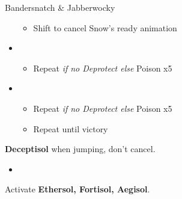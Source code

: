 \begin{battle}[0:55]{Bandersnatch \& Jabberwocky}
\begin{itemize}
\begin{itemize}
				      \item Shift to cancel Snow's ready animation
			      \end{itemize}
			\item \fifth
			      \begin{itemize}
				      \item Repeat \textit{if no Deprotect else } Poison x5
			      \end{itemize}
			\item \second
			      \begin{itemize}
				      \item Repeat \textit{if no Deprotect else }Poison x5
				      \item Repeat until victory
			      \end{itemize}
		\end{itemize}
	\end{battle}
	\textbf{Deceptisol} when jumping, don't cancel.

	\begin{menu}
		\begin{itemize}
			\paradigm
				      \begin{itemize}
					      \item {}%
					            {\paradigmline{\med}{\com}{\com}}%
					            {\paradigmline{\sab}{\com}{\com}}%
					            {\paradigmline[3]{\textit{(\sab)}}{\textit{\sen}}{\textit{(\syn)}}}%
					            {\paradigmline{\rav}{\rav}{\syn}}%
					            {\paradigmline{\sab}{\rav}{\rav}}%
					            {\paradigmline{\rav}{\rav}{\rav}}
				      \end{itemize}
		\end{itemize}
	\end{menu}
	
	Activate \textbf{Ethersol, Fortisol, Aegisol}.
	\vfill

	\renewcommand{\second}{[2] Devastation (\sab/\com/\com)}
	\renewcommand{\fifth}{[5] Smart Bomb (\sab/\rav/\rav)}
	\renewcommand{\sixth}{[6] Tri-Disaster (\rav/\rav/\rav)}
	\renewcommand{\third}{[3] Premeditation (\sab/\sen/\syn)}
	\renewcommand{\first}{[1] Tireless Charge (\med/\com/\com)}


